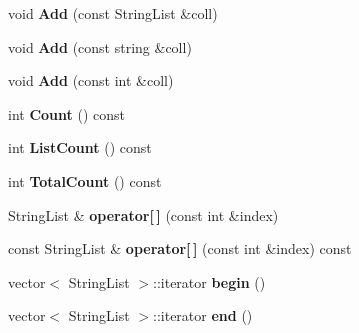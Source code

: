 \begin{DoxyCompactItemize}
\item 
\hypertarget{classrr_1_1_string_list_container_a56f973d2d901409d27b88185cff068f0}{void {\bfseries Add} (const String\-List \&coll)}\label{classrr_1_1_string_list_container_a56f973d2d901409d27b88185cff068f0}

\item 
\hypertarget{classrr_1_1_string_list_container_a8d577a9d7eeabe3dd893948e525dd363}{void {\bfseries Add} (const string \&coll)}\label{classrr_1_1_string_list_container_a8d577a9d7eeabe3dd893948e525dd363}

\item 
\hypertarget{classrr_1_1_string_list_container_a1a6199853a60571a6636a35eae8c83fd}{void {\bfseries Add} (const int \&coll)}\label{classrr_1_1_string_list_container_a1a6199853a60571a6636a35eae8c83fd}

\item 
\hypertarget{classrr_1_1_string_list_container_aeb91fa3e59e697ac18530af89d081274}{int {\bfseries Count} () const }\label{classrr_1_1_string_list_container_aeb91fa3e59e697ac18530af89d081274}

\item 
\hypertarget{classrr_1_1_string_list_container_aa8e756cf007f797d72d0742d8c623308}{int {\bfseries List\-Count} () const }\label{classrr_1_1_string_list_container_aa8e756cf007f797d72d0742d8c623308}

\item 
\hypertarget{classrr_1_1_string_list_container_ade6b247b6bc268937c4874e1ac32399f}{int {\bfseries Total\-Count} () const }\label{classrr_1_1_string_list_container_ade6b247b6bc268937c4874e1ac32399f}

\item 
\hypertarget{classrr_1_1_string_list_container_ae6b288dbbde7b6a71db453fabdd13e3a}{String\-List \& {\bfseries operator\mbox{[}$\,$\mbox{]}} (const int \&index)}\label{classrr_1_1_string_list_container_ae6b288dbbde7b6a71db453fabdd13e3a}

\item 
\hypertarget{classrr_1_1_string_list_container_ab1527e83839805c7d6fa757dfd7803b1}{const String\-List \& {\bfseries operator\mbox{[}$\,$\mbox{]}} (const int \&index) const }\label{classrr_1_1_string_list_container_ab1527e83839805c7d6fa757dfd7803b1}

\item 
\hypertarget{classrr_1_1_string_list_container_aea2d1b681381efc71b21eeb425ac1279}{vector$<$ String\-List $>$\-::iterator {\bfseries begin} ()}\label{classrr_1_1_string_list_container_aea2d1b681381efc71b21eeb425ac1279}

\item 
\hypertarget{classrr_1_1_string_list_container_a4b127b80234153b06e6a583d1109b185}{vector$<$ String\-List $>$\-::iterator {\bfseries end} ()}\label{classrr_1_1_string_list_container_a4b127b80234153b06e6a583d1109b185}

\end{DoxyCompactItemize}
